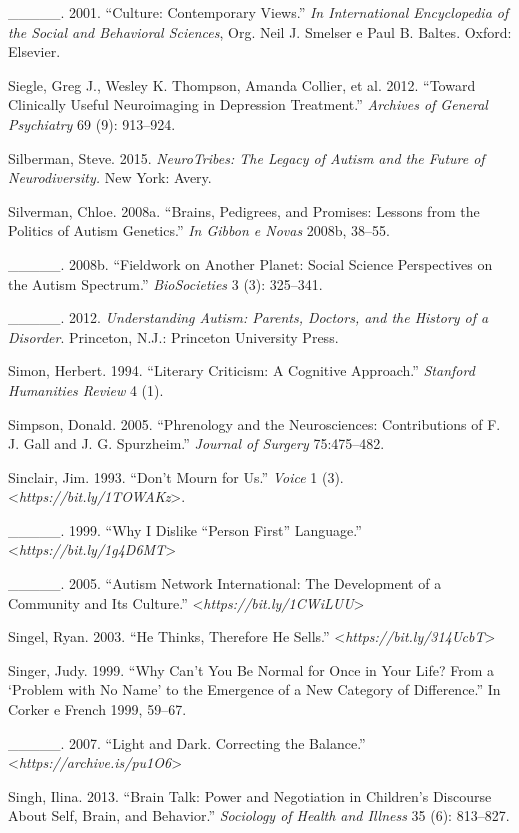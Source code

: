 {\begin{Parskip}
\_\_\_\_\_. 2001. ``Culture: Contemporary Views.'' \emph{In International
Encyclopedia of the Social and Behavioral Sciences}, Org. Neil J.
Smelser e Paul B. Baltes. Oxford: Elsevier.

Siegle, Greg J., Wesley K. Thompson, Amanda Collier, et al. 2012.
``Toward Clinically Useful Neuroimaging in Depression Treatment.''
\emph{Archives of General Psychiatry} 69 (9): 913--924.

Silberman, Steve. 2015. \emph{NeuroTribes: The Legacy of Autism and the
Future of Neurodiversity.} New York: Avery.

Silverman, Chloe. 2008a. ``Brains, Pedigrees, and Promises: Lessons from
the Politics of Autism Genetics.'' \emph{In Gibbon e Novas} 2008b,
38--55.

\_\_\_\_\_. 2008b. ``Fieldwork on Another Planet: Social Science
Perspectives on the Autism Spectrum.'' \emph{BioSocieties} 3 (3):
325--341.

\_\_\_\_\_. 2012. \emph{Understanding Autism: Parents, Doctors, and the
History of a Disorder}. Princeton, N.J.: Princeton University Press.

Simon, Herbert. 1994. ``Literary Criticism: A Cognitive Approach.''
\emph{Stanford Humanities Review} 4 (1).

Simpson, Donald. 2005. ``Phrenology and the Neurosciences: Contributions
of F. J. Gall and J. G. Spurzheim.'' \emph{ Journal of Surgery}
75:475--482.

Sinclair, Jim. 1993. ``Don't Mourn for Us.'' \emph{Voice} 1 (3).
\textless{}\emph{https://bit.ly/1TOWAKz}\textgreater{}.

\_\_\_\_\_. 1999. ``Why I Dislike ``Person First'' Language.''
\textless{}\emph{https://bit.ly/1g4D6MT}\textgreater{}

\_\_\_\_\_. 2005. ``Autism Network International: The Development of a
Community and Its Culture.''
\textless{}\emph{https://bit.ly/1CWiLUU}\textgreater{}

Singel, Ryan. 2003. ``He Thinks, Therefore He Sells.''
\textless{}\emph{https://bit.ly/314UcbT}\textgreater{}

Singer, Judy. 1999. ``Why Can't You Be Normal for Once in Your Life?
From a `Problem with No Name' to the Emergence of a New Category of
Difference.'' In Corker e French 1999, 59--67.

\_\_\_\_\_. 2007. ``Light and Dark. Correcting the Balance.''
\textless{}\emph{https://archive.is/pu1O6}\textgreater{}

Singh, Ilina. 2013. ``Brain Talk: Power and Negotiation in Children's
Discourse About Self, Brain, and Behavior.'' \emph{Sociology of Health
and Illness} 35 (6): 813--827.


\end{Parskip}}

